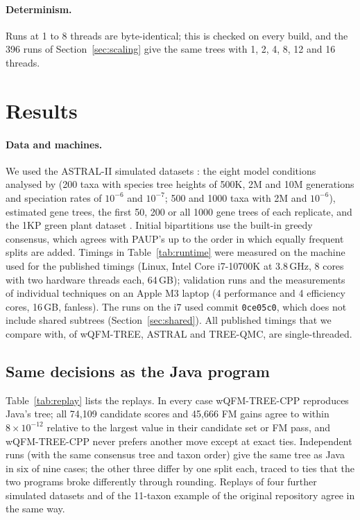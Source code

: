 \documentclass[11pt,a4paper]{article}
\newcommand{\wqfmtree}{wQFM-TREE}
\newcommand{\cpp}{wQFM-TREE-CPP}
\begin{document}
\paragraph{Determinism.} Runs at 1 to 8 threads are byte-identical; this is checked on every build,
and the 396 runs of Section~\ref{sec:scaling} give the same trees with 1, 2, 4, 8, 12 and 16 threads.

\section{Results}\label{sec:results}

\paragraph{Data and machines.} We used the ASTRAL-II simulated datasets \citep{mirarab2015astral2}:
the eight model conditions analysed by \citet{rafi2025wqfmtree} (200 taxa with species tree heights
of 500K, 2M and 10M generations and speciation rates of $10^{-6}$ and $10^{-7}$; 500 and 1000 taxa
with 2M and $10^{-6}$), estimated gene trees, the first 50, 200 or all 1000 gene trees of each
replicate, and the 1KP green plant dataset \citep{onekp2019}. Initial bipartitions use the built-in
greedy consensus, which agrees with PAUP's \citep{swofford2002paup} up to the order in which equally
frequent splits are added. Timings in Table~\ref{tab:runtime} were measured on the machine used for
the published timings (Linux, Intel Core i7-10700K at 3.8\,GHz, 8 cores with two hardware threads
each, 64\,GB); validation runs and
the measurements of individual techniques on an Apple M3 laptop (4 performance and 4 efficiency
cores, 16\,GB, fanless). The runs on the i7 used commit \texttt{0ce05c0}, which does not include
shared subtrees (Section~\ref{sec:shared}). All published timings that we compare with, of
\wqfmtree{}, ASTRAL and TREE-QMC, are single-threaded.

\subsection{Same decisions as the Java program}

Table~\ref{tab:replay} lists the replays. In every case \cpp{} reproduces Java's tree; all 74{,}109
candidate scores and 45{,}666 FM gains agree to within $8\times10^{-12}$ relative to the largest value
in their candidate set or FM pass, and \cpp{} never prefers another move except at exact ties.
Independent runs (with the same consensus tree and taxon order) give the same tree as Java in six of
nine cases; the other three differ by one split each, traced to ties that the two programs broke
differently through rounding. Replays of four further simulated datasets and of the 11-taxon example
of the original repository agree in the same way.
\end{document}
